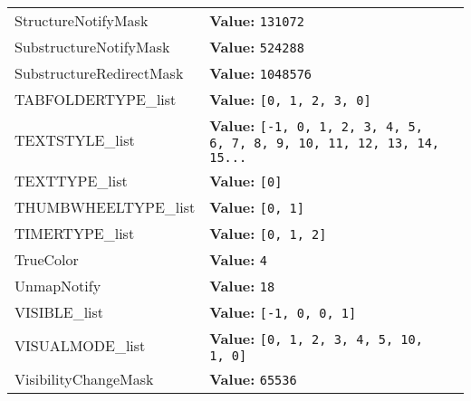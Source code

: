 \begin{longtable}{|p{\varnamewidth}|p{\vardescrwidth}|l}
\cline{1-2}
\raggedright S\-t\-r\-u\-c\-t\-u\-r\-e\-N\-o\-t\-i\-f\-y\-M\-a\-s\-k\- & \raggedright \textbf{Value:} 
{\tt 131072}&\\
\cline{1-2}
\raggedright S\-u\-b\-s\-t\-r\-u\-c\-t\-u\-r\-e\-N\-o\-t\-i\-f\-y\-M\-a\-s\-k\- & \raggedright \textbf{Value:} 
{\tt 524288}&\\
\cline{1-2}
\raggedright S\-u\-b\-s\-t\-r\-u\-c\-t\-u\-r\-e\-R\-e\-d\-i\-r\-e\-c\-t\-M\-a\-s\-k\- & \raggedright \textbf{Value:} 
{\tt 1048576}&\\
\cline{1-2}
\raggedright T\-A\-B\-F\-O\-L\-D\-E\-R\-T\-Y\-P\-E\-\_\-l\-i\-s\-t\- & \raggedright \textbf{Value:} 
{\tt \texttt{[}0\texttt{, }1\texttt{, }2\texttt{, }3\texttt{, }0\texttt{]}}&\\
\cline{1-2}
\raggedright T\-E\-X\-T\-S\-T\-Y\-L\-E\-\_\-l\-i\-s\-t\- & \raggedright \textbf{Value:} 
{\tt \texttt{[}-1\texttt{, }0\texttt{, }1\texttt{, }2\texttt{, }3\texttt{, }4\texttt{, }5\texttt{, }6\texttt{, }7\texttt{, }8\texttt{, }9\texttt{, }10\texttt{, }11\texttt{, }12\texttt{, }13\texttt{, }14\texttt{, }15\texttt{...}}&\\
\cline{1-2}
\raggedright T\-E\-X\-T\-T\-Y\-P\-E\-\_\-l\-i\-s\-t\- & \raggedright \textbf{Value:} 
{\tt \texttt{[}0\texttt{]}}&\\
\cline{1-2}
\raggedright T\-H\-U\-M\-B\-W\-H\-E\-E\-L\-T\-Y\-P\-E\-\_\-l\-i\-s\-t\- & \raggedright \textbf{Value:} 
{\tt \texttt{[}0\texttt{, }1\texttt{]}}&\\
\cline{1-2}
\raggedright T\-I\-M\-E\-R\-T\-Y\-P\-E\-\_\-l\-i\-s\-t\- & \raggedright \textbf{Value:} 
{\tt \texttt{[}0\texttt{, }1\texttt{, }2\texttt{]}}&\\
\cline{1-2}
\raggedright T\-r\-u\-e\-C\-o\-l\-o\-r\- & \raggedright \textbf{Value:} 
{\tt 4}&\\
\cline{1-2}
\raggedright U\-n\-m\-a\-p\-N\-o\-t\-i\-f\-y\- & \raggedright \textbf{Value:} 
{\tt 18}&\\
\cline{1-2}
\raggedright V\-I\-S\-I\-B\-L\-E\-\_\-l\-i\-s\-t\- & \raggedright \textbf{Value:} 
{\tt \texttt{[}-1\texttt{, }0\texttt{, }0\texttt{, }1\texttt{]}}&\\
\cline{1-2}
\raggedright V\-I\-S\-U\-A\-L\-M\-O\-D\-E\-\_\-l\-i\-s\-t\- & \raggedright \textbf{Value:} 
{\tt \texttt{[}0\texttt{, }1\texttt{, }2\texttt{, }3\texttt{, }4\texttt{, }5\texttt{, }10\texttt{, }1\texttt{, }0\texttt{]}}&\\
\cline{1-2}
\raggedright V\-i\-s\-i\-b\-i\-l\-i\-t\-y\-C\-h\-a\-n\-g\-e\-M\-a\-s\-k\- & \raggedright \textbf{Value:} 
{\tt 65536}&\\

\end{longtable}
